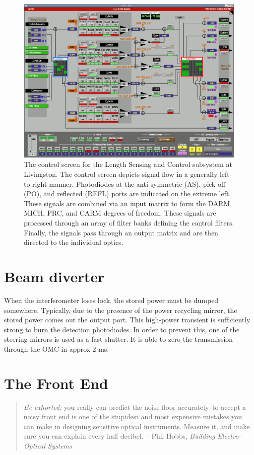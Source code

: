 \begin{figure}
\includegraphics[width=\columnwidth]{figures/L1LSC.png}
\caption[Length Sensing and Control (LSC) control screen]{The control screen for the Length Sensing and Control
  subsystem at Livingston.  The control screen depicts signal flow in
  a generally left-to-right manner.  Photodiodes at the anti-symmetric
  (AS), pick-off (PO), and reflected (REFL) ports are indicated on the
  extreme left.  These signals are combined via an input matrix to
  form the DARM, MICH, PRC, and CARM degrees of freedom.  These
  signals are processed through an array of filter banks defining the
  control filters.  Finally, the signals pass through an output matrix
  and are then directed to the individual optics.}
\end{figure}

\section{Beam diverter}

When the interferometer loses lock, the stored power must be dumped
somewhere. Typically, due to the presence of the power recycling mirror,
the stored power comes out the output port. This high-power transient
is sufficiently strong to burn the detection photodiodes. In order
to prevent this, one of the steering mirrors is used as a fast shutter.
It is able to zero the transmission through the OMC in approx 2 ms.

\section{The Front End}

\begin{quote}
\emph{Be exhorted:} you really can predict the noise floor accurately--to
accept a noisy front end is one of the stupidest and most expensive
mistakes you can make in designing sensitive optical
instruments. Measure it, and make sure you can explain every half
decibel. -- Phil Hobbs, \emph{Building Electro-Optical Systems} \cite{Hobbs2009Building}
\end{quote}
